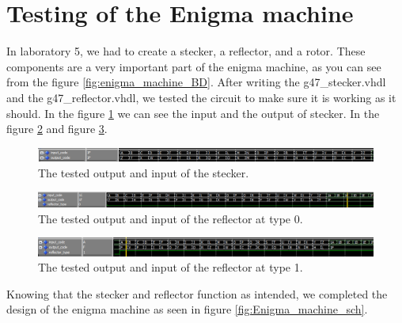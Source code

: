 \documentclass[10pt]{article}
\begin{document}
\section{Testing of the Enigma machine}
In laboratory 5, we had to create a stecker, a reflector, and a rotor. These components are a very important part of the enigma machine, as you can see from the figure \ref{fig:enigma_machine_BD}. After writing the g47\_stecker.vhdl and the g47\_reflector.vhdl, we tested the circuit to make sure it is working as it should. In the figure \ref{fig:stecker_test} we can see the input and the output of stecker. In the figure \ref{fig:refector_0_test} and figure \ref{fig:refector_1_test}.\\
\begin{figure}[!htb]
    \centering
    \includegraphics[width=1\textwidth]{./stecker_test.png}
    \caption{The tested output and input of the stecker.}
    \label{fig:stecker_test}
\end{figure}
\begin{figure}[!htb]
    \centering
    \includegraphics[width=1\textwidth]{./refector_0_test.png}
    \caption{The tested output and input of the reflector at type 0.}
    \label{fig:refector_0_test}
\end{figure}
\begin{figure}[!htb]
    \centering
    \includegraphics[width=1\textwidth]{./refector_1_test.png}
    \caption{The tested output and input of the reflector at type 1.}
    \label{fig:refector_1_test}
\end{figure}
\newline
Knowing that the stecker and reflector function as intended, we completed the design of the enigma machine as seen in figure \ref{fig:Enigma_machine_sch}.\\
\end{document}
